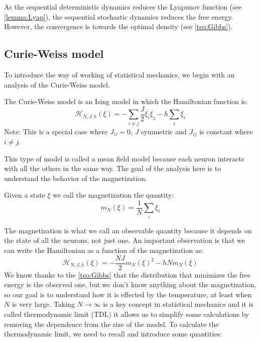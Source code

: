 \noindent As the sequential deterministic dynamics reduces the Lyapunov function (see \cref{lemma:Lyap}), the sequential stochastic dynamics reduces the free energy. However, the convergence is towards the optimal density (see \cref{teo:Gibbs}).

\subsection{Curie-Weiss model}
To introduce the way of working of statistical mechanics, we begin with an analysis of the Curie-Weiss model.
\begin{definition}
	The Curie-Weiss model is an Ising model in which the Hamiltonian function is:
	\[
	\mathcal{H}_{N,J,h}(\xi) = - \sum_{i\neq j} \frac{J}{2} \xi_i \xi_j - h \sum_i \xi_i
	\]
	Note: This is a special case where $J_{ii}=0$, $J$ symmetric and $J_{ij}$ is constant where $i\neq j$.
\end{definition}
This type of model is called a mean field model because each neuron interacts with all the others in the same way. The goal of the analysis here is to understand the behavior of the magnetization.
\begin{definition}[magnetization]
	Given a state $\xi$ we call the magnetization the quantity:
	\[
	m_N(\xi) = \frac{1}{N} \sum_i \xi_i
	\]
\end{definition}
The magnetization is what we call an observable quantity because it depends on the state of all the neurons, not just one. An important observation is that we can write the Hamiltonian as a function of the magnetization as:
\[
	\mathcal{H}_{N,J,h}(\xi) = - \frac{NJ}{2} m_N(\xi)^2 - h N m_N(\xi)
\]
We know thanks to the \cref{teo:Gibbs} that the distribution that minimizes the free energy is the observed one, but we don't know anything about the magnetization, so our goal is to understand how it is effected by the temperature, at least when $N$ is very large. Taking $N \to \infty$ is a key concept in statistical mechanics and it is called thermodynamic limit (TDL) it allows us to simplify some calculations by removing the dependence from the size of the model. To calculate the thermodynamic limit, we need to recall and introduce some quantities:
